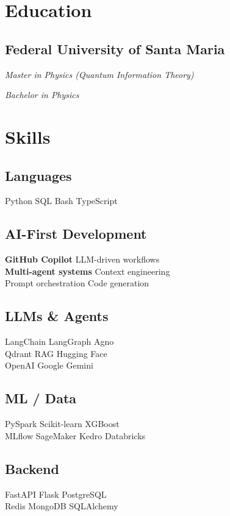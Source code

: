 \documentclass[]{deedy-resume-reversed}
\providecommand{\sectionsep}{\vspace{6pt}} %
\providecommand{\descript}[1]{\hfill\textit{#1}\par\vspace{-2pt}}
\begin{document}
\hspace{0.03\textwidth}
\begin{minipage}[t]{0.35\textwidth}

\section{Education}
\subsection{Federal University of Santa Maria}
\descript{Master in Physics (Quantum Information Theory)}
\descript{Bachelor in Physics}
\sectionsep

\section{Skills}
\subsection{Languages}
Python \textbullet{} SQL \textbullet{} Bash \textbullet{} TypeScript

\subsection{AI-First Development}
\textbf{GitHub Copilot} \textbullet{} LLM-driven workflows \\
\textbf{Multi-agent systems} \textbullet{} Context engineering \\
Prompt orchestration \textbullet{} Code generation

\subsection{LLMs \& Agents}
LangChain \textbullet{} LangGraph \textbullet{} Agno \\
Qdrant \textbullet{} RAG \textbullet{} Hugging Face \\
OpenAI \textbullet{} Google Gemini

\subsection{ML / Data}
PySpark \textbullet{} Scikit-learn \textbullet{} XGBoost \\
MLflow \textbullet{} SageMaker \textbullet{} Kedro \textbullet{} Databricks

\subsection{Backend}
FastAPI \textbullet{} Flask \textbullet{} PostgreSQL \\
Redis \textbullet{} MongoDB \textbullet{} SQLAlchemy


\end{minipage}
\end{document}
